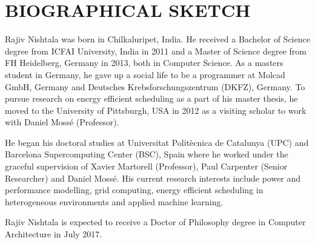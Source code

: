\section*{\hspace{5em} BIOGRAPHICAL SKETCH\hfil}


 Rajiv Nishtala was born in Chilkaluripet, India. He received a Bachelor of Science degree from ICFAI University, India in 2011 and a Master of Science degree from FH Heidelberg,
Germany in 2013, both in Computer Science. As a masters student in Germany, he gave up a
social life to be a programmer at Molcad GmbH, Germany and Deutsches
Krebsforschungszentrum (DKFZ), Germany. To pursue research on energy efficient scheduling
as a part of his master thesis, he moved to the University of Pittsburgh, USA in 2012 as a
visiting scholar to work with Daniel Moss\'e (Professor).

 He began his doctoral studies at Universitat Polit\`ecnica de Catalunya (UPC) and
Barcelona Supercomputing Center (BSC), Spain where he worked  under the graceful
supervision of Xavier Martorell (Professor), Paul Carpenter (Senior Researcher) and Daniel Moss\'e.  His current research interests include power and performance modelling, grid computing, energy efficient scheduling in heterogeneous environments and applied machine learning. 

 Rajiv Nishtala is expected to receive a Doctor of Philosophy degree in Computer Architecture in July 2017.


